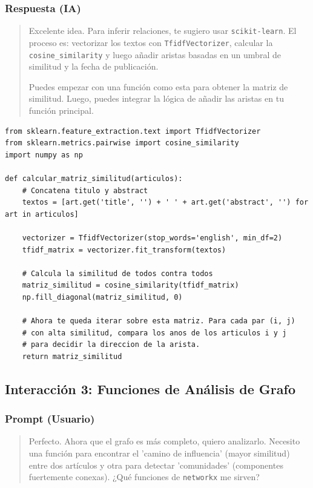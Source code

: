 \documentclass[12pt]{article}
\begin{document}
\subsubsection*{Respuesta (IA)}
\begin{quote}
Excelente idea. Para inferir relaciones, te sugiero usar \texttt{scikit-learn}. El proceso es: vectorizar los textos con \texttt{TfidfVectorizer}, calcular la \texttt{cosine\_similarity} y luego añadir aristas basadas en un umbral de similitud y la fecha de publicación.

Puedes empezar con una función como esta para obtener la matriz de similitud. Luego, puedes integrar la lógica de añadir las aristas en tu función principal.
\end{quote}
\begin{lstlisting}
from sklearn.feature_extraction.text import TfidfVectorizer
from sklearn.metrics.pairwise import cosine_similarity
import numpy as np

def calcular_matriz_similitud(articulos):
    # Concatena titulo y abstract
    textos = [art.get('title', '') + ' ' + art.get('abstract', '') for art in articulos]
    
    vectorizer = TfidfVectorizer(stop_words='english', min_df=2)
    tfidf_matrix = vectorizer.fit_transform(textos)
    
    # Calcula la similitud de todos contra todos
    matriz_similitud = cosine_similarity(tfidf_matrix)
    np.fill_diagonal(matriz_similitud, 0)
    
    # Ahora te queda iterar sobre esta matriz. Para cada par (i, j) 
    # con alta similitud, compara los anos de los articulos i y j 
    # para decidir la direccion de la arista.
    return matriz_similitud
\end{lstlisting}

\subsection{Interacción 3: Funciones de Análisis de Grafo}

\subsubsection*{Prompt (Usuario)}
\begin{quote}
Perfecto. Ahora que el grafo es más completo, quiero analizarlo. Necesito una función para encontrar el 'camino de influencia' (mayor similitud) entre dos artículos y otra para detectar 'comunidades' (componentes fuertemente conexas). ¿Qué funciones de \texttt{networkx} me sirven?
\end{quote}
\end{document}
